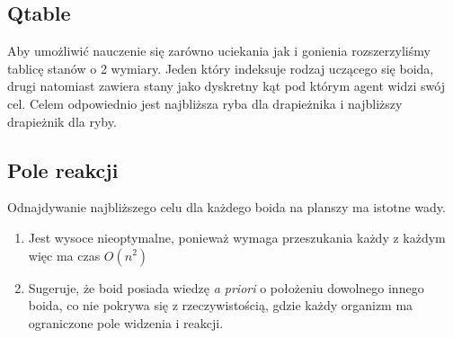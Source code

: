 \documentclass{article}
\begin{document}
\subsection{Qtable}
Aby umożliwić nauczenie się zarówno uciekania jak i gonienia rozszerzyliśmy tablicę stanów o 2 wymiary. Jeden który indeksuje rodzaj uczącego się boida, drugi natomiast zawiera stany jako dyskretny kąt pod którym agent widzi swój cel. Celem odpowiednio jest najbliższa ryba dla drapieżnika i najbliższy drapieżnik dla ryby.
\subsection{Pole reakcji}
Odnajdywanie najbliższego celu dla każdego boida na planszy ma istotne wady.
\begin{enumerate}
    \item Jest wysoce nieoptymalne, ponieważ wymaga przeszukania każdy z każdym więc ma czas \(O(n^2)\)
    \item Sugeruje, że boid posiada wiedzę \textit{a priori} o położeniu dowolnego innego boida, co nie pokrywa się z rzeczywistością, gdzie każdy organizm ma ograniczone pole widzenia i reakcji.
\end{enumerate}
\end{document}
